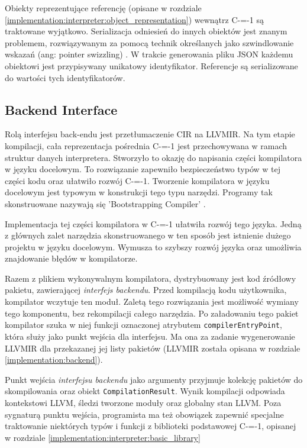 Obiekty reprezentujące referencję (opisane w rozdziale \ref{implementation:interpreter:object_representation}) wewnątrz C-=-1 są traktowane wyjątkowo.
Serializacja odniesień do innych obiektów jest znanym problemem, rozwiązywanym za pomocą technik określanych jako szwindlowanie wskazań (ang: pointer swizzling) \cite{kemper1995swizzling}.
W trakcie generowania pliku JSON każdemu obiektowi jest przypisywany unikatowy identyfikator.
Referencje są serializowane do wartości tych identyfikatorów.

\subsection{Backend Interface}
\label{Backend_Interface}
Rolą interfejsu back-endu jest przetłumaczenie CIR na LLVMIR.
Na tym etapie kompilacji, cała reprezentacja pośrednia C-=-1 jest przechowywana w ramach struktur danych interpretera.
Stworzyło to okazję do napisania części kompilatora w języku docelowym.
To rozwiązanie zapewniło bezpieczeństwo typów w tej części kodu oraz ułatwiło rozwój C-=-1.
Tworzenie kompilatora w języku docelowym jest typowym w konstrukcji tego typu narzędzi.
Programy tak skonstruowane nazywają się 'Bootstrapping Compiler' \cite{puntambekar:compiler_design}. 

Implementacja tej części kompilatora w C-=-1 ułatwiła rozwój tego języka.
Jedną z głównych zalet narzędzia skonstruowanego w ten sposób jest istnienie dużego projektu w języku docelowym.
Wymusza to szybszy rozwój języka oraz umożliwia znajdowanie błędów w kompilatorze.

Razem z plikiem wykonywalnym kompilatora, dystrybuowany jest kod źródłowy pakietu, zawierającej \emph{interfejs backendu}. 
Przed kompilacją kodu użytkownika, kompilator wczytuje ten moduł.
Zaletą tego rozwiązania jest możliwość wymiany tego komponentu, bez rekompilacji całego narzędzia.
Po załadowaniu tego pakiet kompilator szuka w niej funkcji oznaczonej atrybutem \lstinline{compilerEntryPoint}, która służy jako punkt wejścia dla interfejsu. 
Ma ona za zadanie wygenerowanie LLVMIR dla przekazanej jej listy pakietów (LLVMIR została opisana w rozdziale \ref{implementation:backend}).

Punkt wejścia \emph{interfejsu backendu} jako argumenty przyjmuje kolekcję pakietów do skompilowania oraz obiekt \lstinline{CompilationResult}.
Wynik kompilacji odpowiada kontekstowi LLVM, śledzi tworzone moduły oraz globalny stan LLVM.
Poza sygnaturą punktu wejścia, programista ma też obowiązek zapewnić specjalne traktowanie niektórych typów i funkcji z biblioteki podstawowej C-=-1, opisanej w rozdziale \ref{implementation:interpreter:basic_library}

